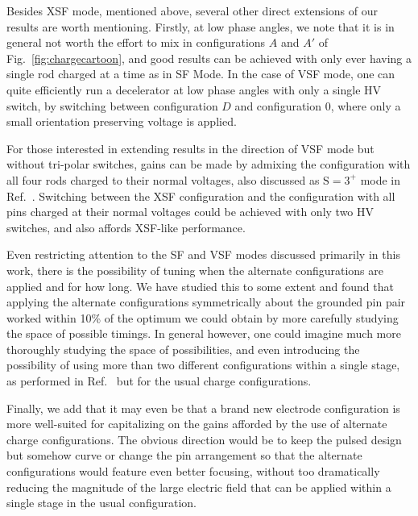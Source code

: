 \documentclass[%
 reprint,
 amsmath,amssymb,
 aps,
prl,
]{revtex4-1}
\begin{document}
Besides XSF mode, mentioned above, several other direct extensions of our results are worth mentioning. Firstly, at low phase angles, we note that it is in general not worth the effort to mix in configurations $A$ and $A'$ of Fig.~\ref{fig:chargecartoon}, and good results can be achieved with only ever having a single rod charged at a time as in SF Mode. In the case of VSF mode, one can quite efficiently run a decelerator at low phase angles with only a single HV switch, by switching between configuration $D$ and configuration $0$, where only a small orientation preserving voltage is applied.

For those interested in extending results in the direction of VSF mode but without tri-polar switches, gains can be made by admixing the configuration with all four rods charged to their normal voltages, also discussed as $\text{S}=3^+$ mode in Ref.~\cite{HudsonThesis2006}. Switching between the XSF configuration and the configuration with all pins charged at their normal voltages could be achieved with only two HV switches, and also affords XSF-like performance.

Even restricting attention to the SF and VSF modes discussed primarily in this work, there is the possibility of tuning when the alternate configurations are applied and for how long. 
We have studied this to some extent and found that applying the alternate configurations symmetrically about the grounded pin pair worked within 10\% of the optimum we could obtain by more carefully studying the space of possible timings.
In general however, one could imagine much more thoroughly studying the space of possibilities, and even introducing the possibility of using more than two different configurations within a single stage, as performed in Ref.~\cite{Zhang2016} but for the usual charge configurations.

Finally, we add that it may even be that a brand new electrode configuration is more well-suited for capitalizing on the gains afforded by the use of alternate charge configurations. The obvious direction would be to keep the pulsed design but somehow curve or change the pin arrangement so that the alternate configurations would feature even better focusing, without too dramatically reducing the magnitude of the large electric field that can be applied within a single stage in the usual configuration.
\end{document}
